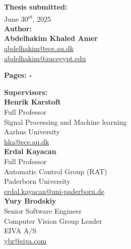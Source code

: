 \begin{minipage}[t]{0.485\textwidth}
\begin{flushleft}


\textbf{Thesis submitted:} \\[5pt]\hspace{2ex}
June 30\textsuperscript{st}, 2025
\\[5pt]
\textbf{Author:} \\[2pt]\hspace*{2ex}
\textbf{Abdelhakim Khaled Amer} \\\hspace*{2ex}
\href{mailto:olaya@ece.au.dk}{abdelhakim@ece.au.dk}\\\hspace*{2ex}
\href{mailto:oat@eiva.com}{abdelhakim@aucegypt.edu}\\\hspace*{2ex}

\textbf{Pages: -} \\
\end{flushleft}
\end{minipage}
\hfill
\begin{minipage}[t]{0.485\textwidth}
\begin{flushleft}

\textbf{Supervisors:} \\[5pt]

\textbf{Henrik Karstoft} \\
Full Professor \\
Signal Processing and Machine learning \\
Aarhus University \\
\href{mailto:hka@ece.au.dk}{hka@ece.au.dk} \\[5pt]

\textbf{Erdal Kayacan} \\
Full Professor \\
Automatic Control Group (RAT) \\
Paderborn University \\
\href{mailto:abkar@mpe.au.dk}{erdal.kayacan@uni-paderborn.de} \\[5pt]

\textbf{Yury Brodskiy} \\
Senior Software Engineer \\
Computer Vision Group Leader \\
EIVA A/S \\
\href{mailto:ybr@eiva.com}{ybr@eiva.com} \\

\end{flushleft}
\end{minipage}

